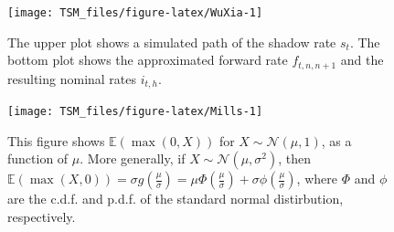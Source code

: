 \documentclass[
  12pt,
]{book}
\newenvironment{Shaded}{\begin{snugshade}}{\end{snugshade}}
\newcommand{\AttributeTok}[1]{\textcolor[rgb]{0.13,0.29,0.53}{#1}}
\newcommand{\DecValTok}[1]{\textcolor[rgb]{0.00,0.00,0.81}{#1}}
\newcommand{\FunctionTok}[1]{\textcolor[rgb]{0.13,0.29,0.53}{\textbf{#1}}}
\newcommand{\NormalTok}[1]{#1}
\newcommand{\SpecialCharTok}[1]{\textcolor[rgb]{0.81,0.36,0.00}{\textbf{#1}}}
\newcommand{\StringTok}[1]{\textcolor[rgb]{0.31,0.60,0.02}{#1}}
\theoremstyle{definition}
\theoremstyle{definition}
\theoremstyle{definition}
\theoremstyle{definition}
\theoremstyle{remark}
\begin{document}
\begin{Shaded}
\end{Shaded}

\begin{figure}

{\centering \texttt{[image: TSM\_files/figure-latex/WuXia-1]} 

}

\caption{The upper plot shows a simulated path of the shadow rate $s_t$. The bottom plot shows the approximated forward rate $f_{t,n,n+1}$ and the resulting nominal rates $i_{t,h}$.}\label{fig:WuXia}
\end{figure}

\begin{figure}

{\centering \texttt{[image: TSM\_files/figure-latex/Mills-1]} 

}

\caption{This figure shows $\mathbb{E}(\max(0,X))$ for $X \sim \mathcal{N}(\mu,1)$, as a function of $\mu$. More generally, if $X\sim \mathcal{N}(\mu,\sigma^2)$, then $\mathbb{E}(\max(X,0))=\sigma g\left(\frac{\mu}{\sigma}\right)= \mu\Phi\left(\frac{\mu}{\sigma}\right)+\sigma\phi\left(\frac{\mu}{\sigma}\right)$, where $\Phi$ and $\phi$ are the c.d.f. and p.d.f. of the standard normal distirbution, respectively.}\label{fig:Mills}
\end{figure}
\end{document}

